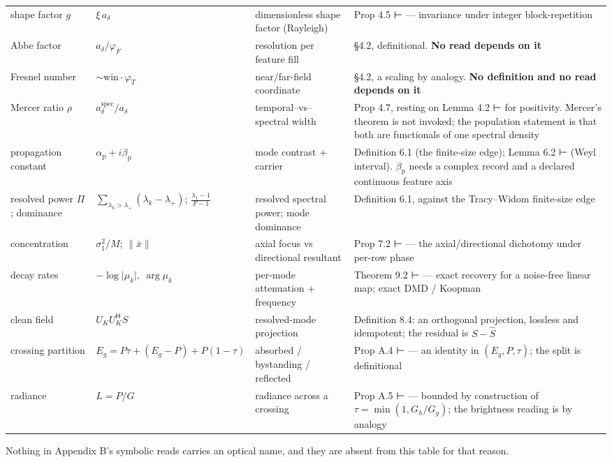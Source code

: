 \documentclass[10pt,letterpaper,twocolumn]{article}
\begin{document}
\begin{table}[tp]
\begin{tabular}{L{0.208\textwidth}L{0.166\textwidth}L{0.167\textwidth}L{0.392\textwidth}}
shape factor \(g\) & \(\xi\,a_\delta\) & dimensionless shape factor (Rayleigh) & Prop 4.5 ⊢ --- invariance under integer block-repetition \\
Abbe factor & \(a_\delta/\varphi_F\) & resolution per feature fill & §4.2, definitional. \textbf{No read depends on it} \\
Fresnel number & \(\sim\!\text{win}\cdot\varphi_T\) & near/far-field coordinate & §4.2, a scaling by analogy. \textbf{No definition and no read depends on
it} \\
Mercer ratio \(\rho\) & \(a_\delta^{\mathrm{spec}}/a_\delta\) & temporal--vs--spectral width & Prop 4.7, resting on Lemma 4.2 ⊢ for positivity. Mercer's theorem is not
invoked; the population statement is that both are functionals of one
spectral density \\
propagation constant & \(\alpha_{\mathrm p}+i\beta_{\mathrm p}\) & mode contrast + carrier & Definition 6.1 (the finite-size edge); Lemma 6.2 ⊢ (Weyl interval).
\(\beta_{\mathrm p}\) needs a complex record and a declared continuous
feature axis \\
resolved power \(\Pi\); dominance & \(\sum_{\lambda_k>\lambda_+}\!(\lambda_k-\lambda_+)\);
\(\tfrac{\lambda_1-1}{F-1}\) & resolved spectral power; mode dominance & Definition 6.1, against the Tracy--Widom finite-size edge \\
concentration & \(\sigma_1^2/M\); \(\lVert\bar x\rVert\) & axial focus vs directional resultant & Prop 7.2 ⊢ --- the axial/directional dichotomy under per-row phase \\
decay rates & \(-\log\lvert\mu_k\rvert,\ \arg\mu_k\) & per-mode attenuation + frequency & Theorem 9.2 ⊢ --- exact recovery for a noise-free linear map; exact DMD
/ Koopman \\
clean field & \(U_KU_K^{\mathsf H}S\) & resolved-mode projection & Definition 8.4: an orthogonal projection, lossless and idempotent; the
residual is \(S-\widehat S\) \\
crossing partition & \(E_g=P\tau+(E_g-P)+P(1-\tau)\) & absorbed / bystanding / reflected & Prop A.4 ⊢ --- an identity in \((E_g,P,\tau)\); the split is
definitional \\
radiance & \(L=P/G\) & radiance across a crossing & Prop A.5 ⊢ --- bounded by construction of \(\tau=\min(1,G_h/G_g)\); the
brightness reading is by analogy \\
\bottomrule
\end{tabular}
\end{table}

Nothing in Appendix B's symbolic reads carries an optical name, and they are absent from this table for that reason.
\end{document}
